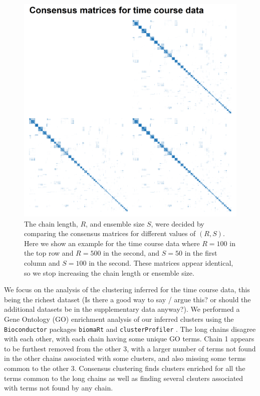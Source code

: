 \documentclass{bioinfo}
\begin{document}
\begin{figure} %
	\centering
	\includegraphics[scale=0.5]{./Images/Yeast/CMs.png}	
	\caption{The chain length, $R$, and ensemble size $S$, were decided by comparing the consensus matrices for different values of $(R, S)$. Here we show an example for the time course data where $R=100$ in the top row and $R=500$ in the second, and $S=50$ in the first column and $S=100$ in the second. These matrices appear identical, so we stop increasing the chain length or ensemble size.}
	\label{fig:yeastCMs}
\end{figure}
We focus on the analysis of the clustering inferred for the time course data, this being the richest dataset (Is there a good way to say / argue this? or should the additional datasets be in the supplementary data anyway?).  
We performed a Gene Ontology (GO) enrichment analysis of our inferred clusters using the \texttt{Bioconductor} packages \texttt{biomaRt} \citep{durinck2005biomart, durinck2009mapping} and \texttt{clusterProfiler} \citep{yu2012clusterProfiler}. The long chains disagree with each other, with each chain having some unique GO terms. Chain 1 appears to be furthest removed from the other 3, with a larger number of terms not found in the other chains associated with some clusters, and also missing some terms common to the other 3. Consensus clustering finds clusters enriched for all the terms common to the long chains as well as finding several clsuters associated with terms not found by any chain. 
\end{document}
